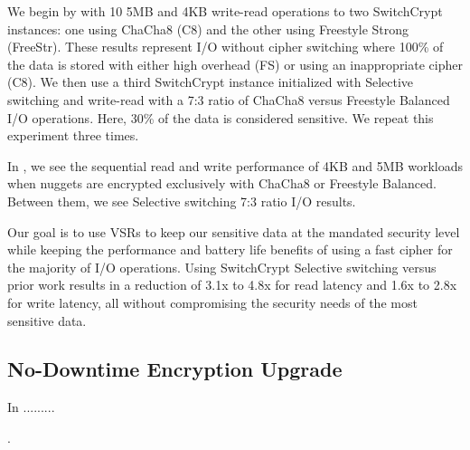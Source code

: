 We begin by with 10 5MB and 4KB write-read operations to two
SwitchCrypt instances: one using ChaCha8 (C8) and the other using Freestyle
Strong (FreeStr). These results represent I/O without cipher switching where 100\% of
the data is stored with either high overhead (FS) or using an inappropriate
cipher (C8). We then use a third SwitchCrypt instance initialized with Selective
switching and write-read with a 7:3 ratio of ChaCha8 versus Freestyle
Balanced I/O operations. Here, 30\% of the data is considered sensitive. We
repeat this experiment three times.



In , we see the sequential read and write performance of
4KB and 5MB workloads when nuggets are encrypted exclusively with ChaCha8 or
Freestyle Balanced. Between them, we see Selective switching 7:3 ratio I/O
results.

Our goal is to use VSRs to keep our sensitive data at the mandated security
level while keeping the performance and battery life benefits of using a fast
cipher for the majority of I/O operations. Using SwitchCrypt Selective switching
versus prior work results in a reduction of 3.1x to 4.8x for read latency and
1.6x to 2.8x for write latency, all without compromising the security needs of
the most sensitive data.



\subsection{No-Downtime Encryption Upgrade} 
\label{subsec:uc3}




In  .........

.

